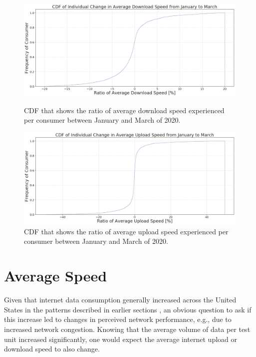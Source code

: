 \documentclass[conference,10pt]{IEEEtran}
\begin{document}
\begin{figure}[t]
  \begin{minipage}[t]{0.496\linewidth}
    \centering
    \includegraphics[width=0.98\linewidth]{figs/downspeed.PNG}
    \caption{CDF that shows the ratio of average download speed experienced per consumer between January and March of 2020.}
    \label{fig:downloadspeed2020}
  \end{minipage}
  \begin{minipage}[t]{0.496\linewidth}
    \centering
    \includegraphics[width=0.98\linewidth]{figs/uploadspeed.PNG}
    \caption{CDF that shows the ratio of average upload speed experienced per consumer between January and March of 2020.}
    \label{fig:uploadspeed2020}
  \end{minipage}
\end{figure}

\section{Average Speed}
\label{sec:average-speed}

Given that internet data consumption generally increased across the United States in the patterns described in earlier sections \cite{feldmann2020lockdown,liu2020characterizing}, an obvious question to ask if this increase led to changes in perceived network performance, e.g., due to increased network congestion. Knowing that the average volume of data per test unit increased significantly, one would expect the average internet upload or download speed to also change.
\end{document}
